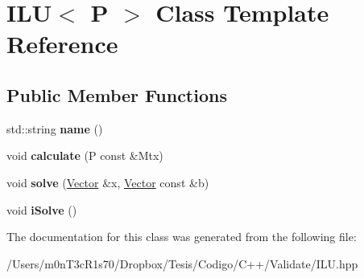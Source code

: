 \hypertarget{class_i_l_u}{}\section{I\+LU$<$ P $>$ Class Template Reference}
\label{class_i_l_u}
\subsection*{Public Member Functions}
\begin{DoxyCompactItemize}
\item 
\hypertarget{class_i_l_u_abf9d903a5d24947e7bbcdb07cb6819b5}{}\label{class_i_l_u_abf9d903a5d24947e7bbcdb07cb6819b5} 
std\+::string {\bfseries name} ()
\item 
\hypertarget{class_i_l_u_a0264dbc48ea463991c329d155cead117}{}\label{class_i_l_u_a0264dbc48ea463991c329d155cead117} 
void {\bfseries calculate} (P const \&Mtx)
\item 
\hypertarget{class_i_l_u_a536eadbeef4496b7143b4872d747f76a}{}\label{class_i_l_u_a536eadbeef4496b7143b4872d747f76a} 
void {\bfseries solve} (\hyperlink{class_vector}{Vector} \&x, \hyperlink{class_vector}{Vector} const \&b)
\item 
\hypertarget{class_i_l_u_a7d31cbfc569a8aebb379f0a7483e83f0}{}\label{class_i_l_u_a7d31cbfc569a8aebb379f0a7483e83f0} 
void {\bfseries i\+Solve} ()
\end{DoxyCompactItemize}


The documentation for this class was generated from the following file\+:\begin{DoxyCompactItemize}
\item 
/\+Users/m0n\+T3c\+R1s70/\+Dropbox/\+Tesis/\+Codigo/\+C++/\+Validate/I\+L\+U.\+hpp\end{DoxyCompactItemize}
